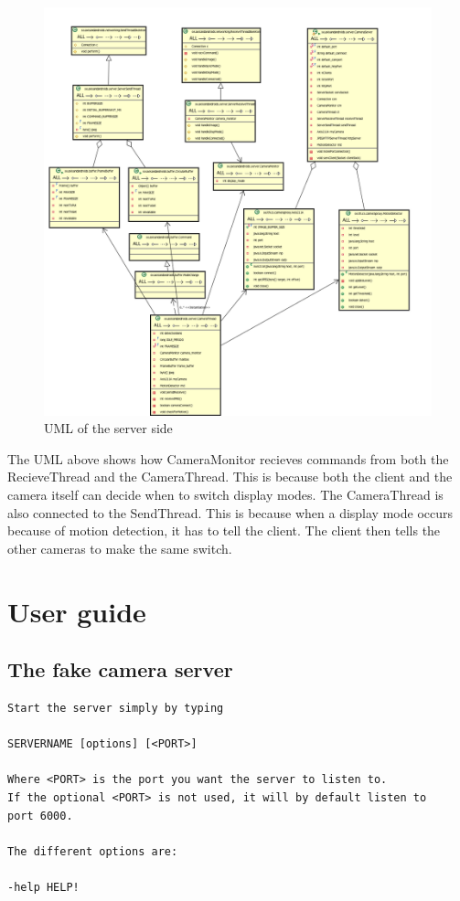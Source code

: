 \documentclass[8pt,titlepage]{article}
\begin{document}
\begin{figure}[hbp]
\includegraphics[width=1.7\textwidth]{../uml/server.png}
\caption{UML of the server side}
\end{figure}

The UML above shows how CameraMonitor recieves commands from both the RecieveThread and the CameraThread. This is because both the client and the camera itself can decide when to switch display modes. The CameraThread is also connected to the SendThread. This is because when a display mode occurs because of motion detection, it has to tell the client. The client then tells the other cameras to make the same switch.

\clearpage
\section{User guide}

\subsection{The fake camera server}
\begin{verbatim}
Start the server simply by typing 

SERVERNAME [options] [<PORT>]

Where <PORT> is the port you want the server to listen to. 
If the optional <PORT> is not used, it will by default listen to 
port 6000.

The different options are:

-help HELP!

\end{verbatim}
\end{document}
